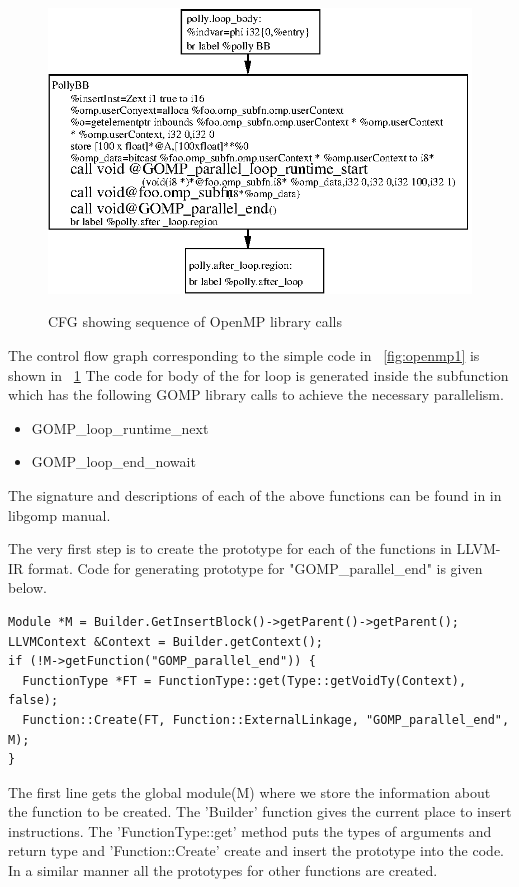 \begin{figure}
\begin{center}
  \label{fig:openmp_cfg}
  \includegraphics[width=14cm]{images/ompcalls.eps}
  \caption{CFG showing sequence of OpenMP library calls}
\end{center}
\end{figure}

The control flow graph corresponding to the simple code in ~\ref{fig:openmp1} is shown in ~\ref{fig:openmp_cfg}
The code for body of the for loop is generated inside the subfunction which has the following GOMP library
calls to achieve the necessary parallelism.

\begin{itemize}
\item GOMP\_loop\_runtime\_next
\item GOMP\_loop\_end\_nowait
\end{itemize}

The signature and descriptions of each of the above functions can be found in in libgomp manual\cite{libgomp}.

The very first step is to create the prototype for each of the functions in LLVM-IR format\cite{kaleid}.
Code for generating prototype for "GOMP\_parallel\_end" is given below.
{\footnotesize
\begin{lstlisting}
Module *M = Builder.GetInsertBlock()->getParent()->getParent();
LLVMContext &Context = Builder.getContext();
if (!M->getFunction("GOMP_parallel_end")) {
  FunctionType *FT = FunctionType::get(Type::getVoidTy(Context), false);
  Function::Create(FT, Function::ExternalLinkage, "GOMP_parallel_end", M);
}
\end{lstlisting}
}
The first line gets the global module(M) where we store the information about the function to be created.
The 'Builder' function gives the current place to insert instructions. The 'FunctionType::get' method
puts the types of arguments and return type and 'Function::Create' create and insert the prototype
into the code. In a similar manner all the prototypes for other functions are created.

